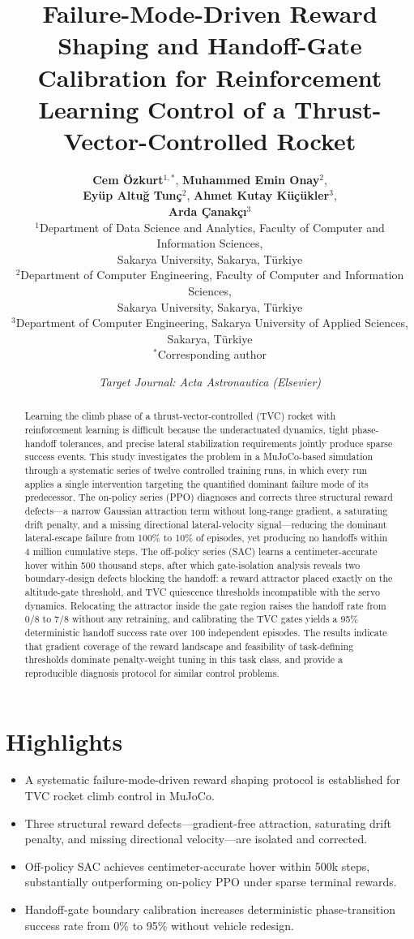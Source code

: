 \documentclass[11pt,a4paper]{article}
\title{\textbf{\Large Failure-Mode-Driven Reward Shaping and Handoff-Gate Calibration for Reinforcement Learning Control of a Thrust-Vector-Controlled Rocket}}
\author{
  \textbf{Cem \"Ozkurt}$^{1,*}$,
  \textbf{Muhammed Emin Onay}$^{2}$,\\[1ex]
  \textbf{Ey\"up Altu\u{g} Tun\c{c}}$^{2}$,
  \textbf{Ahmet Kutay K\"u\c{c}\"ukler}$^{3}$,\\[1ex]
  \textbf{Arda \c{C}anak\c{c}\i}$^{3}$\\[2ex]
  \small $^{1}$Department of Data Science and Analytics, Faculty of Computer and Information Sciences,\\
  \small Sakarya University, Sakarya, T\"urkiye\\[0.5ex]
  \small $^{2}$Department of Computer Engineering, Faculty of Computer and Information Sciences,\\
  \small Sakarya University, Sakarya, T\"urkiye\\[0.5ex]
  \small $^{3}$Department of Computer Engineering, Sakarya University of Applied Sciences, Sakarya, T\"urkiye\\[0.5ex]
  \small $^{*}$Corresponding author
}
\date{\vspace{-1ex}\small\textit{Target Journal: Acta Astronautica (Elsevier)}}
\begin{document}
\maketitle

\section*{Highlights}
\begin{itemize}
    \item A systematic failure-mode-driven reward shaping protocol is established for TVC rocket climb control in MuJoCo.
    \item Three structural reward defects---gradient-free attraction, saturating drift penalty, and missing directional velocity---are isolated and corrected.
    \item Off-policy SAC achieves centimeter-accurate hover within 500k steps, substantially outperforming on-policy PPO under sparse terminal rewards.
    \item Handoff-gate boundary calibration increases deterministic phase-transition success rate from 0\% to 95\% without vehicle redesign.
\end{itemize}

\begin{abstract}
\noindent Learning the climb phase of a thrust-vector-controlled (TVC) rocket with reinforcement learning is difficult because the underactuated dynamics, tight phase-handoff tolerances, and precise lateral stabilization requirements jointly produce sparse success events. This study investigates the problem in a MuJoCo-based simulation through a systematic series of twelve controlled training runs, in which every run applies a single intervention targeting the quantified dominant failure mode of its predecessor. The on-policy series (PPO) diagnoses and corrects three structural reward defects---a narrow Gaussian attraction term without long-range gradient, a saturating drift penalty, and a missing directional lateral-velocity signal---reducing the dominant lateral-escape failure from 100\% to 10\% of episodes, yet producing no handoffs within 4 million cumulative steps. The off-policy series (SAC) learns a centimeter-accurate hover within 500 thousand steps, after which gate-isolation analysis reveals two boundary-design defects blocking the handoff: a reward attractor placed exactly on the altitude-gate threshold, and TVC quiescence thresholds incompatible with the servo dynamics. Relocating the attractor inside the gate region raises the handoff rate from 0/8 to 7/8 without any retraining, and calibrating the TVC gates yields a 95\% deterministic handoff success rate over 100 independent episodes. The results indicate that gradient coverage of the reward landscape and feasibility of task-defining thresholds dominate penalty-weight tuning in this task class, and provide a reproducible diagnosis protocol for similar control problems.
\end{abstract}
\end{document}
